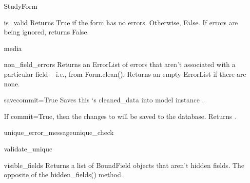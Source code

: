 \documentclass[letterpaper,10pt,english]{sphinxmanual}
\begin{document}
\begin{classdesc}{StudyForm}
\hypertarget{data.forms.StudyForm.is_valid}{}\begin{methoddesc}[StudyForm]{is\_valid}{}
Returns True if the form has no errors. Otherwise, False. If errors are
being ignored, returns False.
\end{methoddesc}

\hypertarget{data.forms.StudyForm.media}{}\begin{memberdesc}[StudyForm]{media}\end{memberdesc}

\hypertarget{data.forms.StudyForm.non_field_errors}{}\begin{methoddesc}[StudyForm]{non\_field\_errors}{}
Returns an ErrorList of errors that aren't associated with a particular
field -- i.e., from Form.clean(). Returns an empty ErrorList if there
are none.
\end{methoddesc}

\hypertarget{data.forms.StudyForm.save}{}\begin{methoddesc}[StudyForm]{save}{commit=True}
Saves this `s cleaned\_data into model instance
.

If commit=True, then the changes to  will be saved to the
database. Returns .
\end{methoddesc}

\hypertarget{data.forms.StudyForm.unique_error_message}{}\begin{methoddesc}[StudyForm]{unique\_error\_message}{unique\_check}\end{methoddesc}

\hypertarget{data.forms.StudyForm.validate_unique}{}\begin{methoddesc}[StudyForm]{validate\_unique}{}\end{methoddesc}

\hypertarget{data.forms.StudyForm.visible_fields}{}\begin{methoddesc}[StudyForm]{visible\_fields}{}
Returns a list of BoundField objects that aren't hidden fields.
The opposite of the hidden\_fields() method.
\end{methoddesc}
\end{classdesc}
\end{document}
